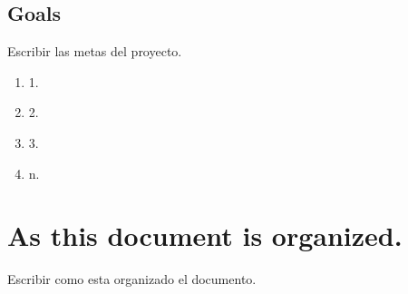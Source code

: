 \subsection{Goals}

Escribir las metas del proyecto.

\begin{enumerate}
\item 1.
\item 2.
\item 3.
\item n.
\end{enumerate}



\section{As this document is organized.}
Escribir como esta organizado el documento.
